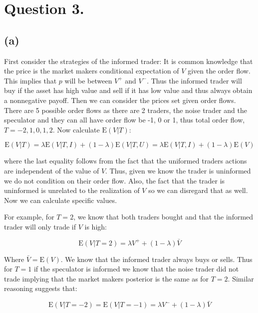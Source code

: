 \documentclass{article}
\begin{document}
\section{Question 3.}

\subsection{(a)}

First consider the strategies of the informed trader: It is common knowledge that the price is the market makers conditional expectation of $V$ given the order flow. This implies that $p$ will be between $V^+$ and $V^-$. Thus the informed trader will buy if the asset has high value and sell if it has low value and thus always obtain a nonnegative payoff. Then we can consider the prices set given order flows. There are 5 possible order flows as there are 2 traders, the noise trader and the speculator and they can all have order flow be -1, 0 or 1, thus total order flow, $T = -2,1,0,1,2$. Now calculate $\mathrm{E}(V \vert T)$:

\begin{equation}
\mathrm{E}(V \vert T) = \lambda \mathrm{E}(V \vert T, I) + (1-\lambda) \mathrm{E}(V \vert T, U) = \lambda \mathrm{E}(V \vert T, I) + (1-\lambda) \mathrm{E}(V)
\end{equation}

where the last equality follows from the fact that the uniformed traders actions are independent of the value of $V$. Thus, given we know the trader is uninformed we do not condition on their order flow. Also, the fact that the trader is uninformed is unrelated to the realization of $V$ so we can disregard that as well. Now we can calculate specific values.

For example, for $T=2$, we know that both traders bought and that the informed trader will only trade if $V$ is high:

\begin{equation}
\mathrm{E}(V \vert T=2) = \lambda V^+ + (1-\lambda)\bar{V}
\end{equation}

Where $\bar{V} = \mathrm{E}(V)$. We know that the informed trader always buys or sells. Thus for $T=1$ if the speculator is informed we know that the noise trader did not trade implying that the market makers posterior is the same as for $T=2$. Similar reasoning suggests that:

\begin{equation}
\mathrm{E}(V \vert T=-2) = \mathrm{E}(V \vert T=-1) = \lambda V^- + (1-\lambda)\bar{V}
\end{equation}
\end{document}
